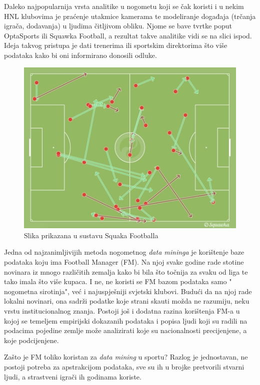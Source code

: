 \documentclass{ferseminar}
\begin{document}
Daleko najpopularnija vrsta analitike u nogometu koji se čak koristi i u nekim HNL klubovima je praćenje utakmice kamerama te modeliranje događaja (trčanja igrača, dodavanja) u ljudima čitljivom obliku. Njome se bave tvrtke poput OptaSports ili Squawka Football, a rezultat takve analitike vidi se na slici ispod. Ideja takvog pristupa je dati trenerima ili sportskim direktorima što više podataka kako bi oni informirano donosili odluke. 

\begin{figure}[htb]
	\centering
	\includegraphics[]{img/squaka.jpg}
	\caption{Slika prikazana u sustavu Squaka Footballa \cite{NBAshots}}
	\label{fig:shots}
\end{figure}

Jedna od najzanimljivijih metoda nogometnog \textit{data mininga} je korištenje baze podataka koju ima Football Manager (FM). Na njoj svake godine rade stotine novinara iz mnogo različitih zemalja kako bi bila što točnija za svaku od liga te tako imala što više kupaca. I ne, ne koristi se FM bazom podataka samo " nogometna sirotinja", već i najuspješniji svjetski klubovi. \cite{FM} Budući da na njoj rade lokalni novinari, ona sadrži podatke koje strani skauti možda ne razumiju, neku vrstu institucionalnog znanja. Postoji još i dodatna razina korištenja FM-a u kojoj se temeljem empirijski dokazanih podataka i popisa ljudi koji su radili na podacima pojedine zemlje može analizirati koje su nacionalnosti precijenjene, a koje podcijenjene.

Zašto je FM toliko koristan za \textit{data mining} u sportu? Razlog je jednostavan, ne postoji potreba za apstrakcijom podataka, sve su ih u brojke pretvorili stvarni ljudi, a strastveni igrači ih godinama koriste. 
\end{document}
